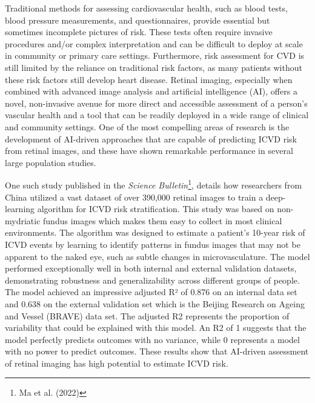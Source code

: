 \documentclass[
  Letterpaper,
]{scrbook}
\begin{document}
Traditional methods for assessing cardiovascular health, such as blood
tests, blood pressure measurements, and questionnaires, provide
essential but sometimes incomplete pictures of risk. These tests often
require invasive procedures and/or complex interpretation and can be
difficult to deploy at scale in community or primary care settings.
Furthermore, risk assessment for CVD is still limited by the reliance on
traditional risk factors, as many patients without these risk factors
still develop heart disease. Retinal imaging, especially when combined
with advanced image analysis and artificial intelligence (AI), offers a
novel, non-invasive avenue for more direct and accessible assessment of
a person's vascular health and a tool that can be readily deployed in a
wide range of clinical and community settings. One of the most
compelling areas of research is the development of AI-driven approaches
that are capable of predicting ICVD risk from retinal images, and these
have shown remarkable performance in several large population studies.

One such study published in the \emph{Science Bulletin}\footnote{Ma et
  al. (2022)}, details how researchers from China utilized a vast
dataset of over 390,000 retinal images to train a deep-learning
algorithm for ICVD risk stratification. This study was based on
non-mydriatic fundus images which makes them easy to collect in most
clinical environments. The algorithm was designed to estimate a
patient's 10-year risk of ICVD events by learning to identify patterns
in fundus images that may not be apparent to the naked eye, such as
subtle changes in microvasculature. The model performed exceptionally
well in both internal and external validation datasets, demonstrating
robustness and generalizability across different groups of people. The
model achieved an impressive adjusted R² of 0.876 on an internal data
set and 0.638 on the external validation set which is the Beijing
Research on Ageing and Vessel (BRAVE) data set. The adjusted R2
represents the proportion of variability that could be explained with
this model. An R2 of 1 suggests that the model perfectly predicts
outcomes with no variance, while 0 represents a model with no power to
predict outcomes. These results show that AI-driven assessment of
retinal imaging has high potential to estimate ICVD risk.
\end{document}
